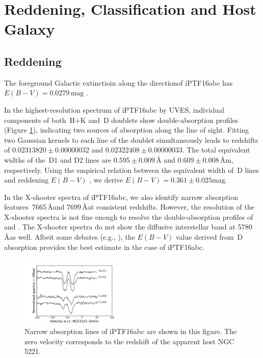 \documentclass[twocolumn]{aastex61}
\begin{document}
\section{Reddening, Classification and Host Galaxy}
\label{sec:usual_staff}

\subsection{Reddening}
\label{sec:reddening}

The foreground Galactic extinctioin along the directionof iPTF16abc
has $E(B-V)=0.0279\,\textrm{mag}$ \citep{2011ApJ...737..103S}.

In the highest-resolution spectrum of iPTF16abc by UVES, individual
components of both \,H$+$K and \,D doublets show
double-absorption profiles (Figure \ref{fig:narrow_features}),
indicating two sources of absorption along the line of sight. Fitting
two Gaussian kernels to each line of the  doublet
simultaneously leads to redshifts of $0.02313820\pm0.00000032$ and
$0.02322408\pm0.00000033$. The total equivalent widths of the
\,D1 and D2 lines are $0.595\pm0.009\,\textrm{\AA}$ and
$0.609\pm0.008\,\textrm{\AA}$m, respectively. Using the empirical
relation between the equivalent width of \,D lines and
reddening $E(B-V)$ \citep{2012MNRAS.426.1465P}, we derive
$E(B-V)=0.361\pm0.025\textrm{mag}$.

In the X-shooter spectra of iPTF16abc, we also identify narrow
absorption features \,7665\,\AA and 7699\,\AA at consistent
redshifts. However, the resolution of the X-shooter spectra is not
fine enough to resolve the double-absorption profiles of 
and . The X-shooter spectra do not show the diffusive
interstellar band at 5780\,\AA as well.  Albeit some debates (e.g.,
\citealt{2013ApJ...779...38P}), the $E(B-V)$ value derived from
\,D absorption provides the best estimate in the case of
iPTF16abc.

\begin{figure}[htb]
  \centering
  \includegraphics[width=0.45\textwidth]{narrow_abs_features.pdf}
  \caption{Narrow absorption lines of iPTF16abc are shown in this
    figure. The zero velocity corresponds to the redshift of the
    apparent host NGC\,5221.}
  \label{fig:narrow_features}
\end{figure}
\end{document}
